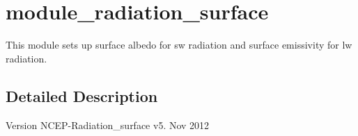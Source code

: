 \hypertarget{group__module__radiation__surface}{}\section{module\+\_\+radiation\+\_\+surface}
\label{group__module__radiation__surface}


This module sets up surface albedo for sw radiation and surface emissivity for lw radiation.  




\subsection{Detailed Description}
\begin{DoxyVersion}{Version}
N\+C\+E\+P-\/\+Radiation\+\_\+surface v5. Nov 2012 
\end{DoxyVersion}
